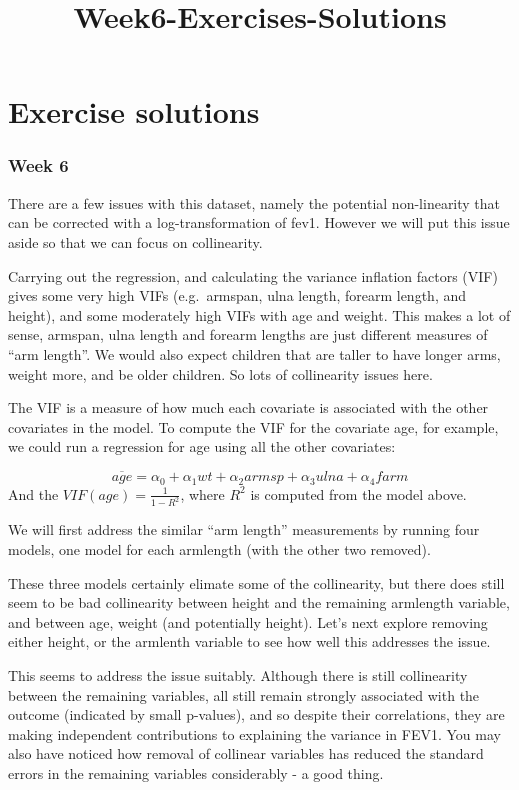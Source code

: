 \documentclass[
  letterpaper,
  DIV=11,
  numbers=noendperiod]{scrreprt}
\title{Week6-Exercises-Solutions}
\author{}
\date{}
\begin{document}
\maketitle


\chapter{Exercise solutions}\label{exercise-solutions}

\subsection*{Week 6}\label{week-6}

There are a few issues with this dataset, namely the potential
non-linearity that can be corrected with a log-transformation of fev1.
However we will put this issue aside so that we can focus on
collinearity.

Carrying out the regression, and calculating the variance inflation
factors (VIF) gives some very high VIFs (e.g.~armspan, ulna length,
forearm length, and height), and some moderately high VIFs with age and
weight. This makes a lot of sense, armspan, ulna length and forearm
lengths are just different measures of ``arm length''. We would also
expect children that are taller to have longer arms, weight more, and be
older children. So lots of collinearity issues here.

The VIF is a measure of how much each covariate is associated with the
other covariates in the model. To compute the VIF for the covariate age,
for example, we could run a regression for age using all the other
covariates:

\[\overline{age} =\alpha_0 + \alpha_1 wt + \alpha_2 armsp + \alpha_3 ulna + \alpha_4 farm\]
And the \(VIF(age) =\frac{1}{1-R^2}\), where \(R^2\) is computed from
the model above.

We will first address the similar ``arm length'' measurements by running
four models, one model for each armlength (with the other two removed).

These three models certainly elimate some of the collinearity, but there
does still seem to be bad collinearity between height and the remaining
armlength variable, and between age, weight (and potentially height).
Let's next explore removing either height, or the armlenth variable to
see how well this addresses the issue.

This seems to address the issue suitably. Although there is still
collinearity between the remaining variables, all still remain strongly
associated with the outcome (indicated by small p-values), and so
despite their correlations, they are making independent contributions to
explaining the variance in FEV1. You may also have noticed how removal
of collinear variables has reduced the standard errors in the remaining
variables considerably - a good thing.
\end{document}
